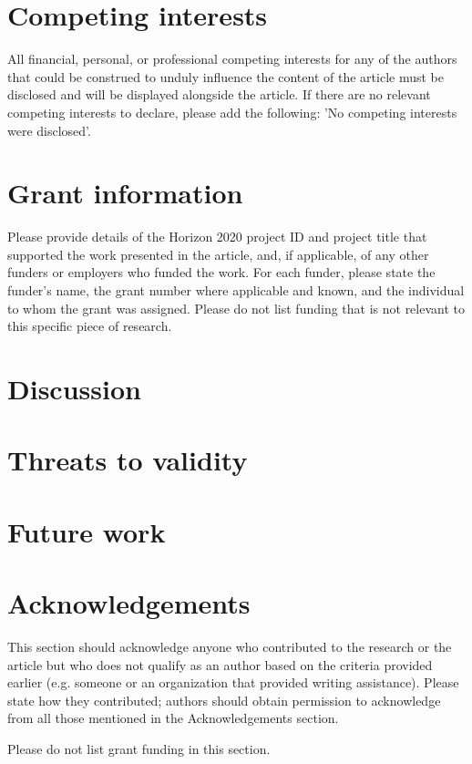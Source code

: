 \documentclass[10pt,a4paper]{article}
\begin{document}
\section*{Competing interests}
All financial, personal, or professional competing interests for any of the authors that could be construed to unduly influence the content of the article must be disclosed and will be displayed alongside the article. If there are no relevant competing interests to declare, please add the following: 'No competing interests were disclosed'.

\section*{Grant information}
Please provide details of the Horizon 2020 project ID and project title that supported the work presented in the article, and, if applicable, of any other funders or employers who funded the work. For each funder, please state the funder’s name, the grant number where applicable and known, and the individual to whom the grant was assigned.
Please do not list funding that is not relevant to this specific piece of research.

\section*{Discussion}

\section*{Threats to validity}

\section*{Future work}

\section*{Acknowledgements}
This section should acknowledge anyone who contributed to the research or the article but who does not qualify as an author based on the criteria provided earlier (e.g. someone or an organization that provided writing assistance). Please state how they contributed; authors should obtain permission to acknowledge from all those mentioned in the Acknowledgements section.

Please do not list grant funding in this section.

{\small
}
\end{document}
